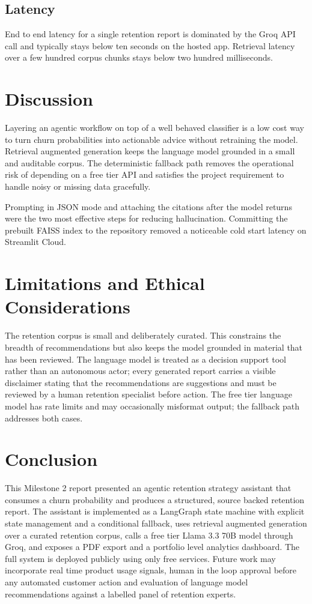 \documentclass[conference]{IEEEtran}
\begin{document}
\subsection{Latency}
End to end latency for a single retention report is dominated by the Groq API call and typically stays below ten seconds on the hosted app. Retrieval latency over a few hundred corpus chunks stays below two hundred milliseconds.

\section{Discussion}
Layering an agentic workflow on top of a well behaved classifier is a low cost way to turn churn probabilities into actionable advice without retraining the model. Retrieval augmented generation keeps the language model grounded in a small and auditable corpus. The deterministic fallback path removes the operational risk of depending on a free tier API and satisfies the project requirement to handle noisy or missing data gracefully.

Prompting in JSON mode and attaching the citations after the model returns were the two most effective steps for reducing hallucination. Committing the prebuilt FAISS index to the repository removed a noticeable cold start latency on Streamlit Cloud.

\section{Limitations and Ethical Considerations}
The retention corpus is small and deliberately curated. This constrains the breadth of recommendations but also keeps the model grounded in material that has been reviewed. The language model is treated as a decision support tool rather than an autonomous actor; every generated report carries a visible disclaimer stating that the recommendations are suggestions and must be reviewed by a human retention specialist before action. The free tier language model has rate limits and may occasionally misformat output; the fallback path addresses both cases.

\section{Conclusion}
This Milestone 2 report presented an agentic retention strategy assistant that consumes a churn probability and produces a structured, source backed retention report. The assistant is implemented as a LangGraph state machine with explicit state management and a conditional fallback, uses retrieval augmented generation over a curated retention corpus, calls a free tier Llama 3.3 70B model through Groq, and exposes a PDF export and a portfolio level analytics dashboard. The full system is deployed publicly using only free services. Future work may incorporate real time product usage signals, human in the loop approval before any automated customer action and evaluation of language model recommendations against a labelled panel of retention experts.
\end{document}
